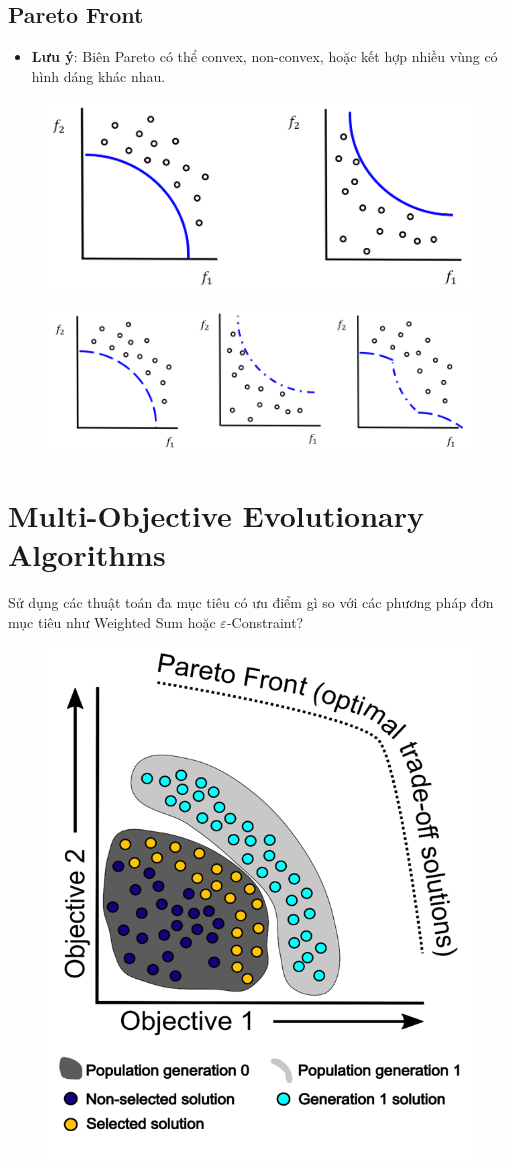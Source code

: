 \documentclass{book}
\begin{document}
\subsection{Pareto Front}
\begin{itemize}
    \item \textbf{Lưu ý}: Biên Pareto có thể convex, non-convex, hoặc kết hợp nhiều vùng có hình dáng khác nhau.
\end{itemize}

\begin{figure}[H]
    \centering
    \includegraphics[width=0.75\linewidth]{images/GA-7-8_23.png}
\end{figure}

\begin{figure}[H]
    \centering
    \includegraphics[width=0.75\linewidth]{images/GA-7-8_24.png}
\end{figure}

\section*{Multi-Objective Evolutionary Algorithms}

Sử dụng các thuật toán đa mục tiêu có ưu điểm gì so với các phương pháp đơn mục tiêu như Weighted Sum hoặc $\varepsilon$-Constraint?

\begin{figure}[H]
    \centering
    \includegraphics[width=0.5\linewidth]{images/GA-7-8_26.png}
\end{figure}
\end{document}
